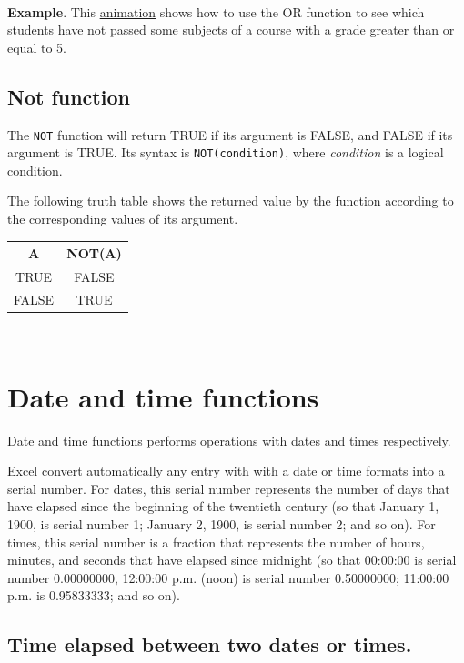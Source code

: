~{}

\textbf{Example}. This \href{http://aprendeconalf.es/office/excel/manual/img/example_function_or.gif}{animation} shows how to use the OR function to see which students have not passed some subjects of a course with a grade greater than or equal to 5.

\subsection{Not function}\hypertarget{not-function}{}\label{not-function}

The \texttt{NOT} function will return TRUE if its argument is FALSE, and FALSE if its argument is TRUE. Its syntax is \texttt{NOT(condition)}, where \emph{condition} is a logical condition.

The following truth table shows the returned value by the function according to the corresponding values of its argument.

\begin{longtable}{|c|c|}
\hline
A & NOT(A)\\
\hline
TRUE & FALSE\\
FALSE & TRUE\\
\hline
\end{longtable}

~{}

\section{Date and time functions}\hypertarget{date-and-time-functions}{}\label{date-and-time-functions}

Date and time functions performs operations with dates and times respectively.

Excel convert automatically any entry with with a date or time formats into a serial number. For dates, this serial number represents the number of days that have elapsed since the beginning of the twentieth century (so that January 1, 1900, is serial number 1; January 2, 1900, is serial number 2; and so on). For times, this serial number is a fraction that represents the number of hours, minutes, and seconds that have elapsed since midnight (so that  00:00:00 is serial number 0.00000000, 12:00:00 p.m. (noon) is serial number 0.50000000; 11:00:00 p.m. is 0.95833333; and so on).

\subsection{Time elapsed between two dates or times.}\hypertarget{time-elapsed-between-two-dates-or-times}{}\label{time-elapsed-between-two-dates-or-times}


